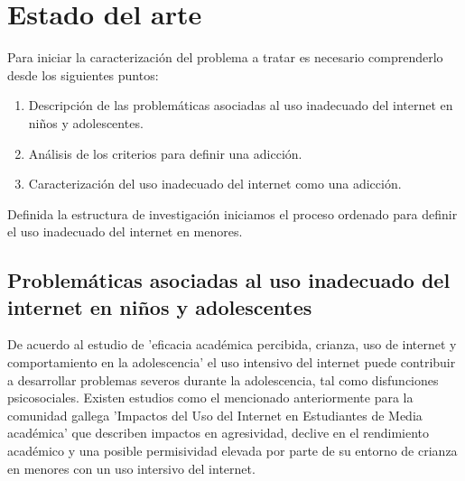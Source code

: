 \documentclass[10pt,letterpaper]{article}
\begin{document}
\newpage
\section{Estado del arte}
Para iniciar la caracterización del problema a tratar es necesario comprenderlo desde los siguientes puntos:
\begin{enumerate}
\item Descripción de las problemáticas asociadas al uso inadecuado del internet en niños y adolescentes.
\item Análisis de los criterios para definir una adicción.
\item Caracterización del uso inadecuado del internet como una adicción.


\end{enumerate}

Definida la estructura de investigación iniciamos el proceso ordenado para definir el uso inadecuado del internet en menores.

\subsection{Problemáticas asociadas al uso inadecuado del internet en niños y adolescentes}
De acuerdo al estudio de 'eficacia académica percibida, crianza, uso de internet y comportamiento en la adolescencia'  \citep{eficacia_academica} el uso intensivo del internet puede contribuir a desarrollar problemas severos durante la adolescencia, tal como disfunciones psicosociales.  Existen estudios como el mencionado anteriormente para la comunidad gallega 'Impactos del Uso del Internet en Estudiantes de Media académica'  \citep{hurtado2024impactos} que describen impactos en agresividad, declive en el rendimiento académico y una posible permisividad elevada por parte de su entorno de crianza en menores con un uso intersivo del internet. 
\end{document}
